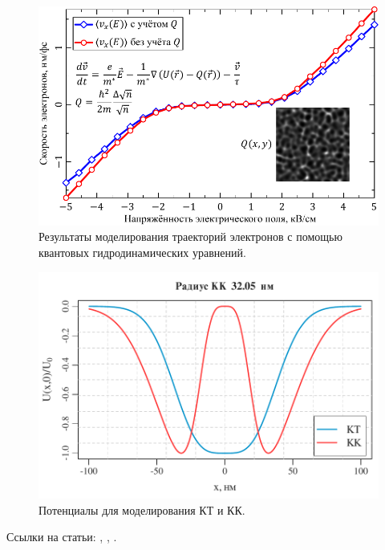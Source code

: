 \documentclass[14pt,oneside]{extarticle}
\begin{document}
\begin{figure}
    \begin{center}
        \includegraphics{images/iv-curve.pdf}
        \caption{\label{fig:iv-curve-1}
            Результаты моделирования траекторий электронов с помощью квантовых гидродинамических уравнений.}
    \end{center}
\end{figure}

\begin{figure}
    \begin{center}
        \includegraphics{images/qd_qr_potential.pdf}
        \caption{\label{fig:qr-potential-1}
            Потенциалы для моделирования КТ и КК.}
    \end{center}
\end{figure}
    
Ссылки на статьи: \cite{miller1}, \cite{miller2}, \cite{mohseni1}.
\end{document}

